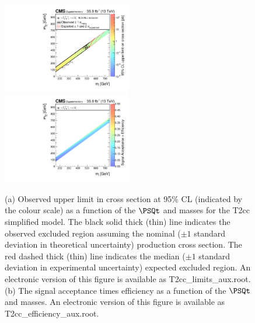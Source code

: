 \begin{figure}
    \begin{center}
            \includegraphics[width=0.50\textwidth]{Supplementary/CMS-SUS-16-038_Figure-aux_020-a}
            \includegraphics[width=0.50\textwidth]{Supplementary/CMS-SUS-16-038_Figure-aux_020-b}
        \caption{ (a) Observed upper limit in cross section at 95\% CL (indicated
        by the colour scale) as a function of 
        the $\PSQt$ and \PSGczDo %
        masses for the 
        T2cc %
        simplified  model.  The  black  solid thick  (thin)  line indicates  the
        observed  excluded  region  assuming   the  nominal  (${\pm}1$  standard
        deviation in theoretical uncertainty)  production cross section. The red
        dashed  thick  (thin)  line  indicates  the  median  (${\pm}1$  standard
        deviation in experimental uncertainty) expected excluded region.
    An electronic version of this figure is available as T2cc\_limits\_aux.root.
        (b) The signal acceptance times efficiency as a function of 
        the $\PSQt$ and \PSGczDo %
        masses.
    An electronic version of this figure is available as T2cc\_efficiency\_aux.root.
        }
        \label{fig:T2cc}
    \end{center}
\end{figure}

